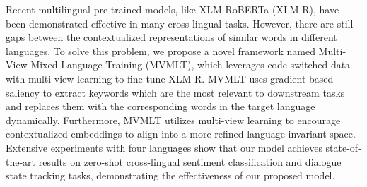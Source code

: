 Recent multilingual pre-trained models, like XLM-RoBERTa (XLM-R), have been demonstrated effective in many cross-lingual tasks. However, there are still gaps between the contextualized representations of similar words in different languages. To solve this problem, we propose a novel framework named Multi-View Mixed Language Training (MVMLT), which leverages code-switched data with multi-view learning to fine-tune XLM-R. MVMLT uses gradient-based saliency to extract keywords which are the most relevant to downstream tasks and replaces them with the corresponding words in the target language dynamically. Furthermore, MVMLT utilizes multi-view learning to encourage contextualized embeddings to align into a more refined language-invariant space. Extensive experiments with four languages show that our model achieves state-of-the-art results on zero-shot cross-lingual sentiment classification and dialogue state tracking tasks, demonstrating the effectiveness of our proposed model.
